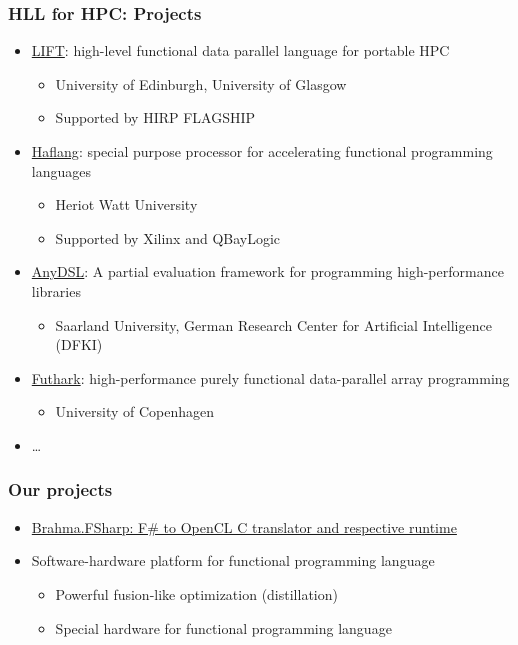 \documentclass[xcolor=table,aspectratio=169]{beamer}
\begin{document}
\begin{frame}[fragile]
  \frametitle{HLL for HPC: Projects}

  \begin{itemize}
    \item \href{https://www.lift-project.org/}{LIFT}: high-level functional data parallel language for portable HPC 
    \begin{itemize}
      \item University of Edinburgh, University of Glasgow      
      \item Supported by HIRP FLAGSHIP
    \end{itemize}
    \item \href{https://haflang.github.io/}{Haflang}: special purpose processor for accelerating functional programming languages 
    \begin{itemize}
      \item Heriot Watt University
      \item Supported by Xilinx and QBayLogic
    \end{itemize}    
    \item \href{https://anydsl.github.io/}{AnyDSL}: A partial evaluation framework for programming high-performance libraries 
    \begin{itemize}
      \item Saarland University, German Research Center for Artificial Intelligence (DFKI)      
    \end{itemize}
    \item \href{https://futhark-lang.org/}{Futhark}: high-performance purely functional data-parallel array programming 
    \begin{itemize}
      \item University of Copenhagen      
    \end{itemize}
    \item \ldots
  \end{itemize}
\end{frame}

\begin{frame}[fragile]
  \frametitle{Our projects}
  \begin{itemize}
    \item \href{https://github.com/YaccConstructor/Brahma.FSharp}{Brahma.FSharp: F\# to OpenCL C translator and respective runtime}
    \pause
    \item Software-hardware platform for functional programming language
    \begin{itemize}
      \item Powerful fusion-like optimization (distillation)
      \item Special hardware for functional programming language
    \end{itemize}
  \end{itemize}
 
\end{frame}
\end{document}
